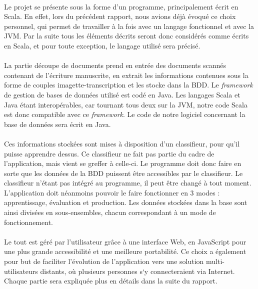 \paragraph{}
Le projet se présente sous la forme d’un programme, principalement écrit en
Scala. En effet, lors du précédent rapport, nous avions déjà évoqué ce choix
personnel, qui permet de travailler à la fois avec un langage fonctionnel
et avec la JVM. Par la suite tous les éléments décrits seront donc considérés
comme écrits en Scala, et pour toute exception, le langage utilisé sera précisé.

\paragraph{}
La partie découpe de documents prend en entrée des documents scannés contenant
de l’écriture manuscrite, en extrait les informations contenues sous la forme
de couples imagette-transcription et les stocke dans la BDD. Le
\textit{framework} de gestion de bases de données utilisé est codé en Java.
Les langages Scala et Java étant interopérables, car tournant tous deux sur la
JVM, notre code Scala est donc compatible avec ce \textit{framework}. Le code
de notre logiciel concernant la base de données sera écrit en Java.

\paragraph{}
Ces informations stockées sont mises à disposition d’un classifieur, pour qu’il
puisse apprendre dessus. Ce classifieur ne fait pas partie du cadre de
l’application, mais vient se greffer à celle-ci. Le programme doit donc faire
en sorte que les données de la BDD puissent être accessibles par le classifieur.
Le classifieur n’étant pas intégré au programme, il peut être changé à tout
moment. L’application doit néanmoins pouvoir le faire fonctionner en 3 modes :
apprentissage, évaluation et production. Les données stockées dans la base sont
ainsi divisées en sous-ensembles, chacun correspondant à un mode de
fonctionnement.

\paragraph{}
Le tout est géré par l’utilisateur grâce à une interface Web, en JavaScript
pour une plus grande accessibilité et une meilleure portabilité. Ce choix a
également pour but de faciliter l’évolution de l’application vers une solution
multi-utilisateurs distants, où plusieurs personnes s‘y connecteraient via
Internet. Chaque partie sera expliquée plus en détails dans la suite du rapport.


